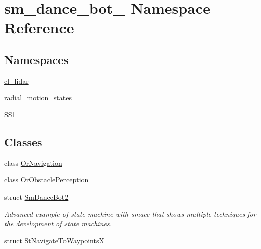 \hypertarget{namespacesm__dance__bot__2}{}\section{sm\+\_\+dance\+\_\+bot\+\_ Namespace Reference}
\label{namespacesm__dance__bot__2}
\subsection*{Namespaces}
\begin{DoxyCompactItemize}
\item 
 \hyperlink{namespacesm__dance__bot__2_1_1cl__lidar}{cl\+\_\+lidar}
\item 
 \hyperlink{namespacesm__dance__bot__2_1_1radial__motion__states}{radial\+\_\+motion\+\_\+states}
\item 
 \hyperlink{namespacesm__dance__bot__2_1_1SS1}{S\+S1}
\end{DoxyCompactItemize}
\subsection*{Classes}
\begin{DoxyCompactItemize}
\item 
class \hyperlink{classsm__dance__bot__2_1_1OrNavigation}{Or\+Navigation}
\item 
class \hyperlink{classsm__dance__bot__2_1_1OrObstaclePerception}{Or\+Obstacle\+Perception}
\item 
struct \hyperlink{structsm__dance__bot__2_1_1SmDanceBot2}{Sm\+Dance\+Bot2}
\begin{DoxyCompactList}\small\item\em Advanced example of state machine with smacc that shows multiple techniques for the development of state machines. \end{DoxyCompactList}\item 
struct \hyperlink{structsm__dance__bot__2_1_1StNavigateToWaypointsX}{St\+Navigate\+To\+WaypointsX}
\end{DoxyCompactItemize}
